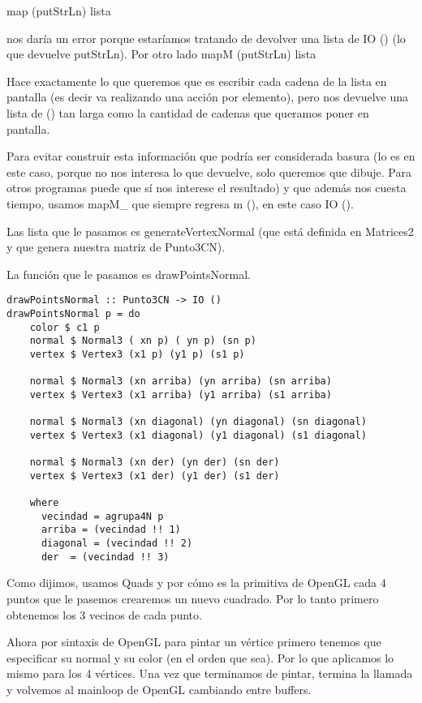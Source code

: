 \documentclass{article}
\begin{document}
map (putStrLn) lista 

nos daría un error porque estaríamos tratando de devolver una lista de IO () (lo que devuelve putStrLn). Por otro lado 
mapM (putStrLn) lista

Hace exactamente lo que queremos que es escribir cada cadena de la lista en pantalla (es decir va realizando una acción por elemento), pero nos devuelve una lista de () tan larga como la cantidad de cadenas que queramos poner en pantalla.

Para evitar construir esta información que podría ser considerada basura (lo es en este caso, porque no nos interesa lo que devuelve, solo queremos que dibuje. Para otros programas puede que sí nos interese el resultado) y que además nos cuesta tiempo, usamos mapM\_ que siempre regresa m (), en este caso IO ().

Las lista que le pasamos es generateVertexNormal (que está definida en Matrices2 y que genera nuestra matriz de Punto3CN).

La función que le pasamos es drawPointsNormal.
\begin{verbatim}
drawPointsNormal :: Punto3CN -> IO ()
drawPointsNormal p = do
    color $ c1 p
    normal $ Normal3 ( xn p) ( yn p) (sn p)
    vertex $ Vertex3 (x1 p) (y1 p) (s1 p)

    normal $ Normal3 (xn arriba) (yn arriba) (sn arriba)
    vertex $ Vertex3 (x1 arriba) (y1 arriba) (s1 arriba)

    normal $ Normal3 (xn diagonal) (yn diagonal) (sn diagonal)
    vertex $ Vertex3 (x1 diagonal) (y1 diagonal) (s1 diagonal)

    normal $ Normal3 (xn der) (yn der) (sn der)
    vertex $ Vertex3 (x1 der) (y1 der) (s1 der)

    where
      vecindad = agrupa4N p
      arriba = (vecindad !! 1)
      diagonal = (vecindad !! 2)
      der  = (vecindad !! 3)

\end{verbatim}

Como dijimos, usamos Quads y por cómo es la primitiva de OpenGL cada 4 puntos que le pasemos crearemos un nuevo cuadrado. Por lo tanto primero obtenemos los 3 vecinos de cada punto.

Ahora por sintaxis de OpenGL para pintar un vértice primero tenemos que especificar su normal y su color (en el orden que sea). Por lo que aplicamos lo mismo para los 4 vértices. 
Una vez que terminamos de pintar, termina la llamada y volvemos al mainloop de OpenGL cambiando entre buffers.
\end{document}
